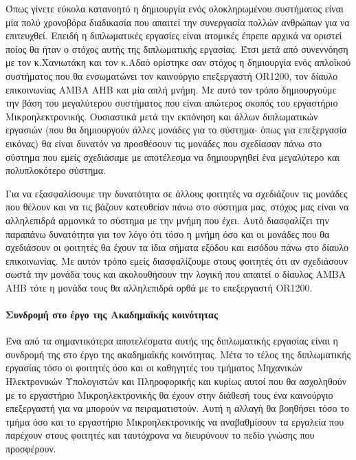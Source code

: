 \documentclass[a4paper,10pt]{article}
\numberwithin{figure}{section}
\numberwithin{table}{section}
\begin{document}
Όπως γίνετε εύκολα κατανοητό η δημιουργία ενός ολοκληρωμένου συστήματος είναι μία πολύ χρονοβόρα διαδικασία που απαιτεί την συνεργασία πολλών ανθρώπων για να επιτευχθεί. Επειδή η διπλωματικές εργασίες είναι ατομικές έπρεπε αρχικά να οριστεί ποίος θα ήταν ο στόχος αυτής της διπλωματικής εργασίας. Έτσι μετά από συνεννόηση με τον κ.Χανιωτάκη και τον κ.Αδαό ορίστηκε σαν στόχος η δημιουργία ενός απλοϊκού συστήματος που θα ενσωματώνει τον καινούργιο επεξεργαστή ΟR1200, τον δίαυλο επικοινωνίας AMBA AHB και μία απλή μνήμη. Με αυτό τον τρόπο δημιουργούμε την βάση του μεγαλύτερου συστήματος που είναι απώτερος σκοπός του εργαστήριο Μικροηλεκτρονικής. Ουσιαστικά μετά την εκπόνηση και άλλων διπλωματικών εργασιών (που θα δημιουργούν άλλες μονάδες για το σύστημα- όπως για επεξεργασία εικόνας) θα είναι δυνατόν να προσθέσουν τις μονάδες που σχεδίασαν πάνω στο σύστημα που εμείς σχεδιάσαμε με αποτέλεσμα να δημιουργηθεί ένα μεγαλύτερο και πολυπλοκότερο σύστημα.
\newline

 Για να εξασφαλίσουμε την δυνατότητα σε άλλους φοιτητές να σχεδιάζουν τις μονάδες που θέλουν και να τις βάζουν κατευθείαν πάνω στο σύστημα μας, στόχος μας είναι να αλληλεπιδρά αρμονικά το σύστημα με την μνήμη που έχει. Αυτό διασφαλίζει την παραπάνω δυνατότητα για τον λόγο ότι τόσο η μνήμη όσο και οι μονάδες που θα σχεδιάσουν οι φοιτητές θα έχουν τα ίδια σήματα εξόδου και εισόδου πάνω στο δίαυλο επικοινωνίας. Με αυτόν τρόπο εμείς διασφαλίζουμε στους φοιτητές ότι αν σχεδιάσουν σωστά την μονάδα τους και ακολουθήσουν την λογική που απαιτεί ο δίαυλος AMBA AHB τότε η μονάδα τους θα αλληλεπιδρά ορθά με το επεξεργαστή ΟR1200.


\paragraph{\newline\newline Συνδρομή στο έργο της Ακαδημαϊκής κοινότητας \newline\newline}

Ένα από τα σημαντικότερα αποτελέσματα αυτής της διπλωματικής εργασίας είναι η συνδρομή της στο έργο της ακαδημαϊκής κοινότητας. Μέτα το τέλος της διπλωματικής εργασίας τόσο οι φοιτητές όσο και οι καθηγητές του τμήματος Μηχανικών Ηλεκτρονικών Υπολογιστών και Πληροφορικής και κυρίως αυτοί που θα ασχοληθούν με το εργαστήριο Μικροηλεκτρονικής θα έχουν στην διάθεσή τους ένα καινούργιο επεξεργαστή για να μπορούν να πειραματιστούν. Αυτή η αλλαγή θα βοηθήσει τόσο το τμήμα όσο και το εργαστήριο Μικροηλεκτρονικής να αναβαθμίσουν τα εργαλεία που παρέχουν στους φοιτητές και ταυτόχρονα να διευρύνουν το πεδίο γνώσης που προσφέρουν.
\newline
\end{document}
